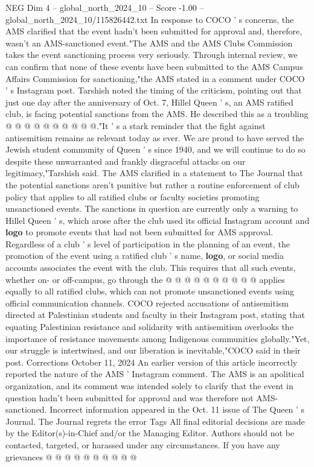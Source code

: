 \begin{textsample}{NEG Dim 4 – global\_north\_2024\_10 – Score -1.00 – global\_north\_2024\_10/115826442.txt}
In response to COCO ' s concerns, the AMS clarified that the event hadn't been submitted for approval and, therefore, wasn't an AMS-sanctioned event."The AMS and the AMS Clubs Commission takes the event sanctioning process very seriously.
Through internal review, we can confirm that none of these events have been submitted to the AMS Campus Affairs Commission for sanctioning,"the AMS stated in a comment under COCO ' s Instagram post.
Tarshish noted the timing of the criticism, pointing out that just one day after the anniversary of Oct. 7, Hillel Queen ' s, an AMS ratified club, is facing potential sanctions from the AMS.
He described this as a troubling @ @ @ @ @ @ @ @ @ @."It ' s a stark reminder that the fight against antisemitism remains as relevant today as ever.
We are proud to have served the Jewish student community of Queen ' s since 1940, and we will continue to do so despite these unwarranted and frankly disgraceful attacks on our legitimacy,"Tarshish said.
The AMS clarified in a statement to The Journal that the potential sanctions aren't punitive but rather a routine enforcement of club policy that applies to all ratified clubs or faculty societies promoting unsanctioned events.
The sanctions in question are currently only a warning to Hillel Queen ' s, which arose after the club used its official Instagram account and \textbf{logo} to promote events that had not been submitted for AMS approval.
Regardless of a club ' s level of participation in the planning of an event, the promotion of the event using a ratified club ' s name, \textbf{logo}, or social media accounts associates the event with the club.
This requires that all such events, whether on- or off-campus, go through the @ @ @ @ @ @ @ @ @ @ applies equally to all ratified clubs, which can not promote unsanctioned events using official communication channels.
COCO rejected accusations of antisemitism directed at Palestinian students and faculty in their Instagram post, stating that equating Palestinian resistance and solidarity with antisemitism overlooks the importance of resistance movements among Indigenous communities globally."Yet, our struggle is intertwined, and our liberation is inevitable,"COCO said in their post.
Corrections October 11, 2024 An earlier version of this article incorrectly reported the nature of the AMS ' Instagram comment.
The AMS is an apolitical organization, and its comment was intended solely to clarify that the event in question hadn't been submitted for approval and was therefore not AMS-sanctioned.
Incorrect information appeared in the Oct. 11 issue of The Queen ' s Journal.
The Journal regrets the error Tags All final editorial decisions are made by the Editor(s)-in-Chief and/or the Managing Editor.
Authors should not be contacted, targeted, or harassed under any circumstances.
If you have any grievances @ @ @ @ @ @ @ @ @ @

\end{textsample}
